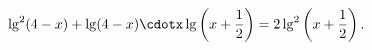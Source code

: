 \begin{ex}[type=equation]
	\begin{condition}
		$\lg^2 (4 - x) + \lg (4-x)\cdotx\lg\left(x + \dfrac{1}{2}\right) = 2\lg^2\left(x + \dfrac{1}{2}\right).$
	\end{condition}
\end{ex}